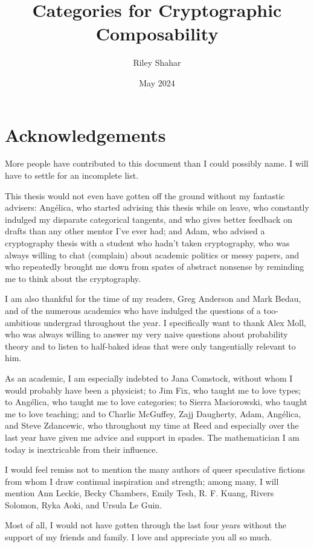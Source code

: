\documentclass[12pt,twoside]{diff-reedthesis}
\title{Categories for Cryptographic Composability}
\author{Riley Shahar}
\date{May 2024}
\begin{document}
\maketitle
\frontmatter
\pagestyle{empty}

\chapter*{Acknowledgements}

More people have contributed to this document than I could possibly name. I will
have to settle for an incomplete list.

This thesis would not even have gotten off the ground without my fantastic
advisers: Angélica, who started advising this thesis while on leave, who
constantly indulged my disparate categorical tangents, and who gives better
feedback on drafts than any other mentor I've ever had; and Adam, who advised a
cryptography thesis with a student who hadn't taken cryptography, who was always
willing to chat (complain) about academic politics or messy papers, and who
repeatedly brought me down from spates of abstract nonsense by reminding me to
think about the cryptography.

I am also thankful for the time of my readers, Greg Anderson and Mark Bedau, and
of the numerous academics who have indulged the questions of a too-ambitious
undergrad throughout the year. I specifically want to thank Alex Moll, who was
always willing to answer my very naive questions about probability theory and to
listen to half-baked ideas that were only tangentially relevant to him.

As an academic, I am especially indebted to Jana Comstock, without whom I would
probably have been a physicist; to Jim Fix, who taught me to love types; to
Angélica, who taught me to love categories; to Sierra Maciorowski, who taught me
to love teaching; and to Charlie McGuffey, Zajj Daugherty, Adam, Angélica, and
Steve Zdancewic, who throughout my time at Reed and especially over the last
year have given me advice and support in spades. The mathematician I am
today is inextricable from their influence.

I would feel remiss not to mention the many authors of queer speculative
fictions from whom I draw continual inspiration and strength; among many, I will
mention Ann Leckie, Becky Chambers, Emily Tesh, R. F. Kuang, Rivers Solomon,
Ryka Aoki, and Ursula Le Guin.

Most of all, I would not have gotten through the last four years without the
support of my friends and family. I love and appreciate you all so much.
\end{document}
